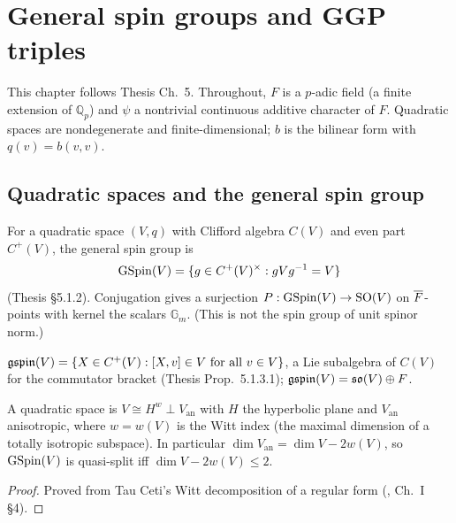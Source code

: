 \chapter{General spin groups and GGP triples}
\label{chap:gspin}
This chapter follows Thesis Ch.~5. Throughout, $F$ is a $p$-adic field (a finite extension of
$\mathbb{Q}_p$) and $\psi$ a nontrivial continuous additive character of $F$. Quadratic spaces are
nondegenerate and finite-dimensional; $b$ is the bilinear form with $q(v)=b(v,v)$.

\section{Quadratic spaces and the general spin group}
\begin{definition}
\label{GSpin}
\leanok
For a quadratic space $(V,q)$ with Clifford algebra $C(V)$ and even part $C^+(V)$, the general spin
group is
\[ \mathrm{GSpin}(V) = \{ g \in C^+(V)^\times : g V g^{-1} = V \} \]
(Thesis \S5.1.2). Conjugation gives a surjection $P:\mathrm{GSpin}(V)\to \mathrm{SO}(V)$ on $\overline{F}$-points with
kernel the scalars $\mathbb{G}_m$. (This is not the spin group of unit spinor norm.)
\end{definition}

\begin{definition}
\label{gspin}
\leanok
{}
$\mathfrak{gspin}(V) = \{ X \in C^+(V) : [X,v] \in V \text{ for all } v\in V\}$, a Lie subalgebra of
$C(V)$ for the commutator bracket (Thesis Prop.~5.1.3.1); $\mathfrak{gspin}(V)=\mathfrak{so}(V)\oplus F$.
\end{definition}

\begin{theorem}
\label{witt_decomposition}
\leanok
\mathlibok
A quadratic space is $V \cong H^{w}\perp V_{\mathrm{an}}$ with $H$ the hyperbolic plane and
$V_{\mathrm{an}}$ anisotropic, where $w=w(V)$ is the Witt index (the maximal dimension of a totally
isotropic subspace). In particular $\dim V_{\mathrm{an}} = \dim V - 2w(V)$, so $\mathrm{GSpin}(V)$ is
quasi-split iff $\dim V - 2w(V)\le 2$.
\end{theorem}
\begin{proof}
\leanok
Proved from Tau Ceti's Witt decomposition of a regular form (\cite{Lam}, Ch.~I \S4).
\end{proof}

